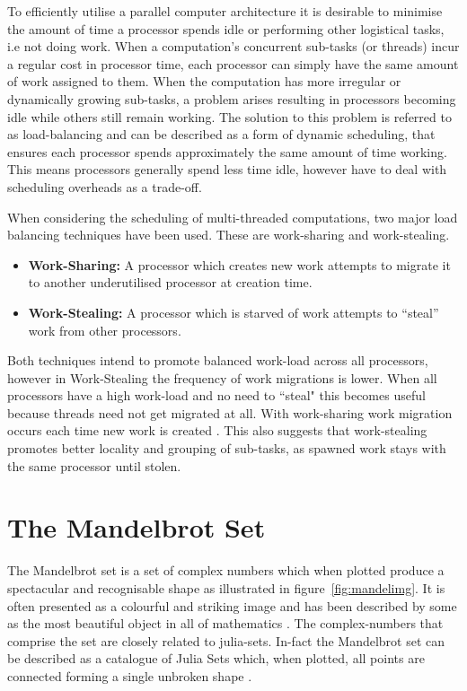 To efficiently utilise a parallel computer architecture it is desirable to minimise
the amount of time a processor spends idle or performing other logistical tasks, i.e not doing work. 
When a computation's concurrent sub-tasks (or \glspl{thread}) incur a regular cost in processor
time, each processor can simply have the same amount of work assigned to them. When the computation has
more irregular or dynamically growing sub-tasks, a problem arises resulting in 
processors becoming idle while others still remain working. The solution to this problem is referred to as
\gls{load-balancing} and can be described as a form of dynamic scheduling, that ensures each processor 
spends approximately the same amount of time working. This means processors generally spend
less time idle, however have to deal with scheduling overheads as a trade-off.

When considering the scheduling of multi-threaded computations, two major load balancing techniques have been used.
These are \gls{work-sharing} and \gls{work-stealing}.

\begin{itemize}
\item \textbf{Work-Sharing:} A processor which creates new work attempts to migrate it to another underutilised processor at creation time. 
\item \textbf{Work-Stealing:} A processor which is starved of work attempts to ``steal'' work from other processors. 
\end{itemize}

Both techniques intend to promote balanced work-load across all processors, however in Work-Stealing
the frequency of work migrations is lower. When all processors have a 
high work-load and no need to ``steal" this becomes useful because threads need not get 
migrated at all. With \gls{work-sharing} work migration occurs each time new work is created \cite{blumleis}.
This also suggests that work-stealing promotes better \gls{locality} and grouping of sub-tasks, as spawned work 
stays with the same processor until stolen.

\section{The Mandelbrot Set}

The Mandelbrot set is a set of complex numbers which when plotted produce a spectacular and recognisable shape as illustrated in figure~\ref{fig:mandelimg}.
It is often presented as a colourful and striking image and has been described by some as the most beautiful object in all of mathematics 
\cite[p.~234]{chaosfract}.
The \glspl{complex-number} that comprise the set are closely related to julia-sets. 
In-fact the Mandelbrot set can be described as a catalogue of Julia Sets which, when plotted, all points are connected 
forming a single unbroken shape \cite[p.~177]{fractimg}.


